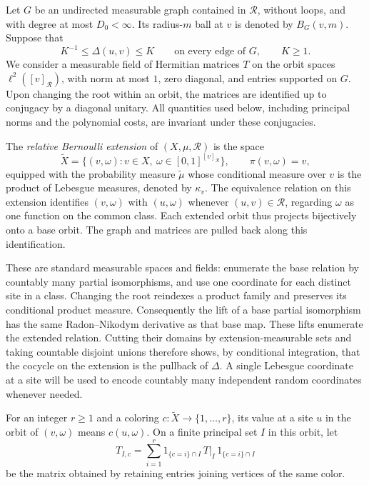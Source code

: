 Let $G$ be an undirected measurable graph contained in $\mathcal R$, without
loops, and with degree at most $D_0<\infty$.  Its radius-$m$ ball at $v$ is
denoted by $B_G(v,m)$.  Suppose that
\begin{equation}
 K^{-1}\leq\Delta(u,v)\leq K
 \qquad\text{on every edge of }G,
 \qquad K\geq1.
 \label{eq:coloring-edge-ratios}
\end{equation}
We consider a measurable field of Hermitian matrices $T$ on the orbit
spaces $\ell^2([v]_{\mathcal R})$, with norm at most $1$, zero diagonal, and
entries supported on $G$.  Upon changing the root within an orbit, the
matrices are identified up to conjugacy by a diagonal unitary.  All
quantities used below, including principal norms and the polynomial costs,
are invariant under these conjugacies.

The \emph{relative Bernoulli extension} of $(X,\mu,\mathcal R)$ is the space
\[
 \widetilde X
   =\{(v,\omega):v\in X,\ \omega\in[0,1]^{[v]_{\mathcal R}}\},
 \qquad \pi(v,\omega)=v,
\]
equipped with the probability measure $\widetilde\mu$ whose conditional
measure over $v$ is the product of Lebesgue measures, denoted by $\kappa_v$.
The equivalence relation on this extension identifies $(v,\omega)$ with
$(u,\omega)$ whenever $(u,v)\in\mathcal R$, regarding $\omega$ as one
function on the common class.  Each extended orbit thus projects bijectively
onto a base orbit.  The graph and matrices are pulled back along this
identification.

These are standard measurable spaces and fields: enumerate the base
relation by countably many partial isomorphisms, and use one coordinate for
each distinct site in a class.  Changing the root reindexes a product
family and preserves its conditional product measure.  Consequently the
lift of a base partial isomorphism has the same Radon--Nikodym derivative
as that base map.  These lifts enumerate the extended relation.  Cutting
their domains by extension-measurable sets and taking countable disjoint
unions therefore shows, by conditional integration, that the cocycle on
the extension is the pullback of $\Delta$.  A single Lebesgue coordinate
at a site will be used to encode countably many independent random
coordinates whenever needed.

For an integer $r\geq1$ and a coloring
$c:\widetilde X\to\{1,\ldots,r\}$, its value at a site $u$
in the orbit of $(v,\omega)$ means $c(u,\omega)$.  On a finite principal
set $I$ in this orbit, let
\[
 T_{I,c}
   =\sum_{i=1}^r 1_{\{c=i\}\cap I}\,T|_I\,
                         1_{\{c=i\}\cap I}
\]
be the matrix obtained by retaining entries joining vertices of the same
color.

